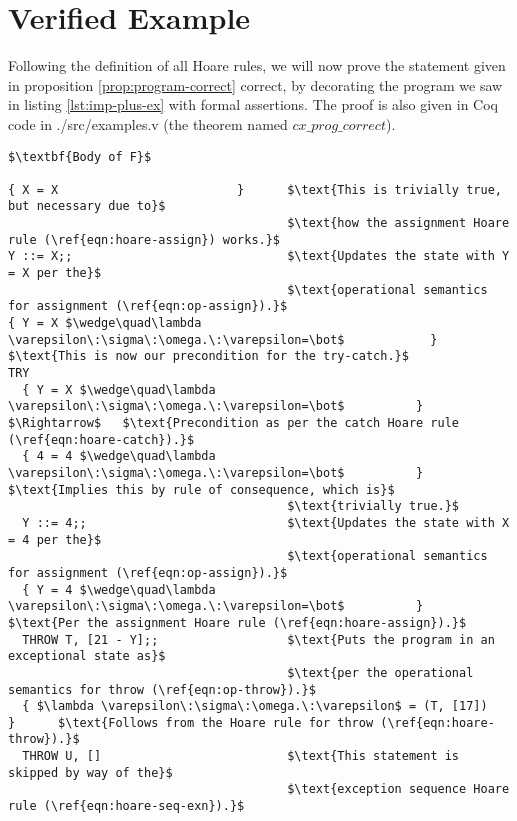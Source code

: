 \section{Verified Example}

Following the definition of all Hoare rules, we will now prove the statement given in proposition \ref{prop:program-correct} correct, by decorating the program we saw in listing \ref{lst:imp-plus-ex} with formal assertions. The proof is also given in Coq code in ./src/examples.v (the theorem named $cx\_prog\_correct$).

\begin{lstlisting}[mathescape=true,keepspaces=true,label=lst:hoare_ex_asgn,caption=Decorated variant of the program from listing \ref{lst:imp-plus-ex}.]
$\textbf{Body of F}$

{ X = X                         }      $\text{This is trivially true, but necessary due to}$
                                       $\text{how the assignment Hoare rule (\ref{eqn:hoare-assign}) works.}$
Y ::= X;;                              $\text{Updates the state with Y = X per the}$
                                       $\text{operational semantics for assignment (\ref{eqn:op-assign}).}$
{ Y = X $\wedge\quad\lambda \varepsilon\:\sigma\:\omega.\:\varepsilon=\bot$            }      $\text{This is now our precondition for the try-catch.}$
TRY
  { Y = X $\wedge\quad\lambda \varepsilon\:\sigma\:\omega.\:\varepsilon=\bot$          } $\Rightarrow$   $\text{Precondition as per the catch Hoare rule (\ref{eqn:hoare-catch}).}$
  { 4 = 4 $\wedge\quad\lambda \varepsilon\:\sigma\:\omega.\:\varepsilon=\bot$          }      $\text{Implies this by rule of consequence, which is}$
                                       $\text{trivially true.}$
  Y ::= 4;;                            $\text{Updates the state with X = 4 per the}$
                                       $\text{operational semantics for assignment (\ref{eqn:op-assign}).}$
  { Y = 4 $\wedge\quad\lambda \varepsilon\:\sigma\:\omega.\:\varepsilon=\bot$          }      $\text{Per the assignment Hoare rule (\ref{eqn:hoare-assign}).}$
  THROW T, [21 - Y];;                  $\text{Puts the program in an exceptional state as}$
                                       $\text{per the operational semantics for throw (\ref{eqn:op-throw}).}$
  { $\lambda \varepsilon\:\sigma\:\omega.\:\varepsilon$ = (T, [17])          }      $\text{Follows from the Hoare rule for throw (\ref{eqn:hoare-throw}).}$
  THROW U, []                          $\text{This statement is skipped by way of the}$
                                       $\text{exception sequence Hoare rule (\ref{eqn:hoare-seq-exn}).}$

\end{lstlisting}
